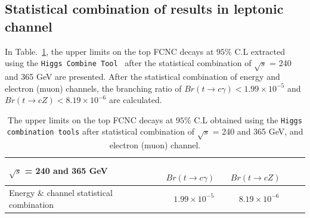 \documentclass[11pt,onecolumn,english,showpacs,preprintnumbers,amsmath,amssymb,floatfix,nofootinbib]{revtex4-1}
\def\to{\rightarrow}
\begin{document}
%
\subsection{Statistical combination of results in leptonic channel}\label{Combination-leptonic}
%



In Table.~\ref{limits-combination-leptonic}, the upper limits on the top FCNC 
decays at $95\%$ C.L extracted using 
the {\tt Higgs Combine Tool}~\cite{Higgs-Combination-Tool} after the statistical combination of $\sqrt {s}$ = 240 and 365 GeV are presented. 
After the statistical combination of energy and electron (muon) channels, the branching ratio of 
 $Br (t \to c \gamma ) < 1.99 \times 10^{-5}$ and $Br (t \to c Z) < 8.19 \times 10^{-6}$ 
are calculated. 

\begin{table}[htbp]
\begin{center}
\begin{tabular}{l|c c c c }  \hline
$\sqrt {s}$ = 240 and 365 GeV  &  ~  $Br (t \to c \gamma )$       &  ~ $Br (t \to c Z)$      \\  \hline
 Energy $\&$ channel statistical combination   &  ~  $ 1.99\times 10^{-5}$        & ~ $ 8.19\times 10^{-6}$        \\   \hline  \hline
\end{tabular}
\end{center}
\caption{ The upper limits on the top FCNC decays at $95\%$ C.L obtained using 
the {\tt Higgs combination tools} after statistical  combination of $\sqrt {s}$ = 240 and 365 GeV, and electron (muon) 
channel. }
\label{limits-combination-leptonic}
\end{table}









\clearpage





%
\end{document}
